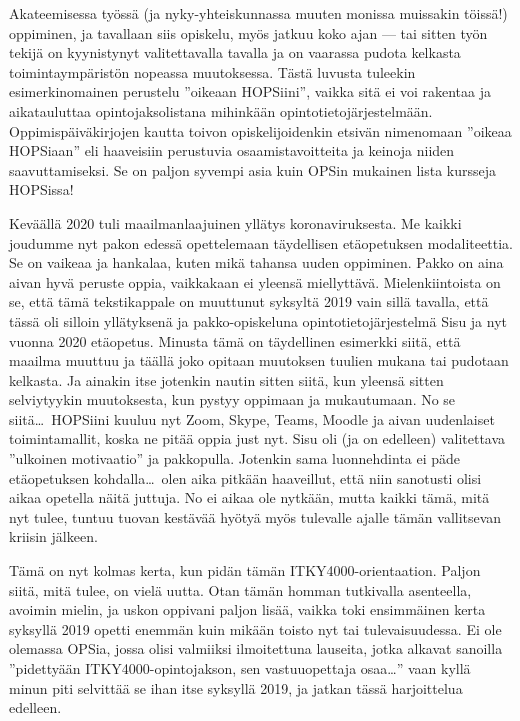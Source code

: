 \documentclass[utf8]{gradu3}
\begin{document}
Akateemisessa työssä (ja nyky-yhteiskunnassa muuten monissa muissakin töissä!)
oppiminen, ja tavallaan siis opiskelu, myös jatkuu koko ajan --- tai sitten työn
tekijä on kyynistynyt valitettavalla tavalla ja on vaarassa pudota kelkasta
toimintaympäristön nopeassa muutoksessa. Tästä luvusta tuleekin esimerkinomainen
perustelu ''oikeaan HOPSiini'', vaikka sitä ei voi rakentaa ja aikatauluttaa
opintojaksolistana mihinkään opintotietojärjestelmään. Oppimispäiväkirjojen
kautta toivon opiskelijoidenkin etsivän nimenomaan ''oikeaa HOPSiaan'' eli
haaveisiin perustuvia osaamistavoitteita ja keinoja niiden saavuttamiseksi. Se
on paljon syvempi asia kuin OPSin mukainen lista kursseja HOPSissa!

Keväällä 2020 tuli maailmanlaajuinen yllätys koronaviruksesta. Me kaikki
joudumme nyt pakon edessä opettelemaan täydellisen etäopetuksen modaliteettia.
Se on vaikeaa ja hankalaa, kuten mikä tahansa uuden oppiminen. Pakko on aina
aivan hyvä peruste oppia, vaikkakaan ei yleensä miellyttävä. Mielenkiintoista on
se, että tämä tekstikappale on muuttunut syksyltä 2019 vain sillä tavalla, että
tässä oli silloin yllätyksenä ja pakko-opiskeluna opintotietojärjestelmä Sisu ja
nyt vuonna 2020 etäopetus. Minusta tämä on täydellinen esimerkki siitä, että
maailma muuttuu ja täällä joko opitaan muutoksen tuulien mukana tai pudotaan
kelkasta. Ja ainakin itse jotenkin nautin sitten siitä, kun yleensä sitten
selviytyykin muutoksesta, kun pystyy oppimaan ja mukautumaan. No se siitä\ldots\
HOPSiini kuuluu nyt Zoom, Skype, Teams, Moodle ja aivan uudenlaiset
toimintamallit, koska ne pitää oppia just nyt. Sisu oli (ja on edelleen)
valitettava ''ulkoinen motivaatio'' ja pakkopulla. Jotenkin sama luonnehdinta ei
päde etäopetuksen kohdalla\ldots\ olen aika pitkään haaveillut, että niin
sanotusti olisi aikaa opetella näitä juttuja. No ei aikaa ole nytkään, mutta
kaikki tämä, mitä nyt tulee, tuntuu tuovan kestävää hyötyä myös tulevalle ajalle
tämän vallitsevan kriisin jälkeen.

Tämä on nyt kolmas kerta, kun pidän tämän ITKY4000-orientaation. Paljon siitä,
mitä tulee, on vielä uutta. Otan tämän homman tutkivalla asenteella, avoimin
mielin, ja uskon oppivani paljon lisää, vaikka toki ensimmäinen kerta syksyllä
2019 opetti enemmän kuin mikään toisto nyt tai tulevaisuudessa. Ei ole olemassa
OPSia, jossa olisi valmiiksi ilmoitettuna lauseita, jotka alkavat sanoilla
''pidettyään ITKY4000-opintojakson, sen vastuuopettaja osaa\ldots '' vaan kyllä
minun piti selvittää se ihan itse syksyllä 2019, ja jatkan tässä harjoittelua
edelleen.
\end{document}
